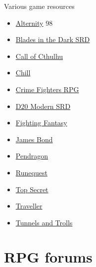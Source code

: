 \documentclass[a4paper, 11pt, twoside]{article}
\begin{document}
Various game resources
\begin{itemize}
\item \href{https://github.com/orey/ttrpg/tree/master/Alternity}{Alternity} 98
\item \href{https://github.com/orey/ttrpg/tree/master/BladesInTheDark-SRD}{Blades in the Dark SRD}
\item \href{https://github.com/orey/ttrpg/tree/master/CallOfCthulhu}{Call of Cthulhu}
\item \href{https://github.com/orey/ttrpg/tree/master/Chill}{Chill}
\item \href{https://github.com/orey/ttrpg/tree/master/CrimeFightersRPG}{Crime Fighters RPG}
\item \href{https://github.com/orey/ttrpg/tree/master/D20-Modern-SRD}{D20 Modern SRD}
\item \href{https://github.com/orey/ttrpg/tree/master/FightingFantasy}{Fighting Fantasy}
\item \href{https://github.com/orey/ttrpg/tree/master/JamesBond}{James Bond}
\item \href{https://github.com/orey/ttrpg/tree/master/Pendragon}{Pendragon}
\item \href{https://github.com/orey/ttrpg/tree/master/Runequest}{Runequest}
\item \href{https://github.com/orey/ttrpg/tree/master/TopSecret}{Top Secret}
\item \href{https://github.com/orey/ttrpg/tree/master/Traveller}{Traveller}
\item \href{https://github.com/orey/ttrpg/tree/master/TunnelsAndTrolls}{Tunnels and Trolls}
\end{itemize}

\section{RPG forums}
\label{sec:org00fe206}
\end{document}
